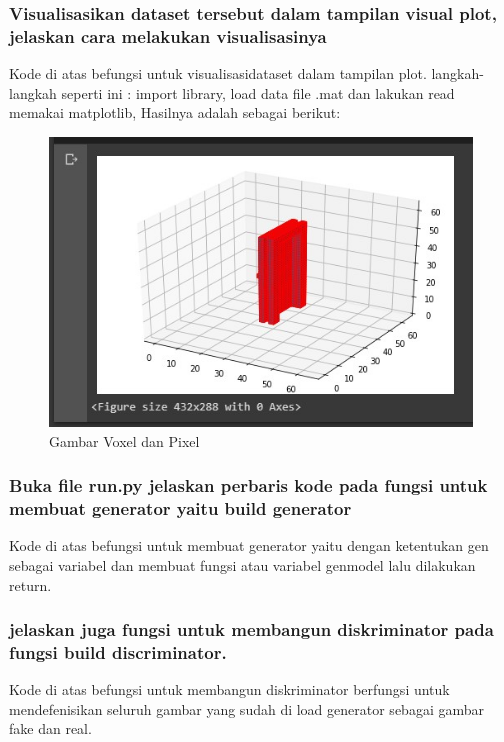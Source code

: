 \subsubsection{Visualisasikan dataset tersebut dalam tampilan visual plot, jelaskan cara melakukan visualisasinya}

Kode di atas befungsi untuk visualisasidataset dalam tampilan plot. langkah-langkah seperti ini :
	import library, load data file .mat dan lakukan read memakai matplotlib, Hasilnya adalah sebagai berikut:
\begin{figure}[H]
	\centering
	\includegraphics[width=12cm]{figures/1174066/8/no8.jpg}
	\caption{Gambar Voxel dan Pixel}
\end{figure}

\subsubsection{Buka file run.py jelaskan perbaris kode pada fungsi untuk membuat generator yaitu build generator}
\hfill\break

Kode di atas befungsi untuk membuat generator yaitu dengan ketentukan gen sebagai variabel dan membuat fungsi atau variabel genmodel lalu dilakukan return. 

\subsubsection{jelaskan juga fungsi untuk membangun diskriminator pada fungsi build discriminator.}
\hfill\break

Kode di atas befungsi untuk membangun diskriminator berfungsi untuk mendefenisikan seluruh gambar yang sudah di load generator sebagai gambar fake dan real.

